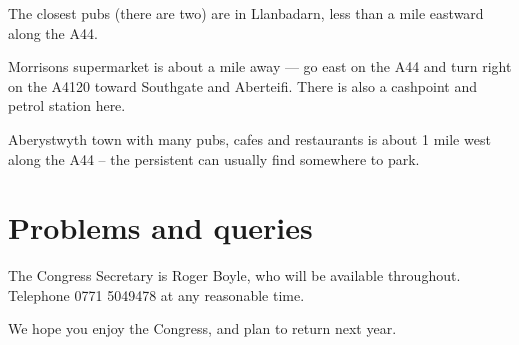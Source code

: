 \documentclass[12pt]{article}
\begin{document}
The closest pubs (there are two) are in Llanbadarn, less than a mile
eastward along the A44.

Morrisons supermarket is about a mile away --- go east on the A44 and
turn right on the A4120 toward Southgate and Aberteifi.  There is also
a cashpoint and petrol station here.

Aberystwyth town with many pubs, cafes and restaurants is about 1
mile west along the A44 -- the persistent can usually find somewhere to
park.

\section{Problems and queries}

The Congress Secretary is Roger Boyle, who will be available
throughout.
Telephone 0771 5049478 at any reasonable time.

We hope you enjoy the Congress, and plan to return next year.
\end{document}
